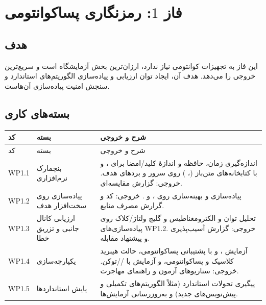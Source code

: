 \section{فاز $1$: رمزنگاری پساکوانتومی}
\label{sec:phase1}
\subsection{هدف}
این فاز به تجهیزات کوانتومی نیاز ندارد، ارزان‌ترین بخش آزمایشگاه است و سریع‌ترین خروجی را می‌دهد. هدف آن، ایجاد توان ارزیابی و پیاده‌سازی الگوریتم‌های استاندارد و سنجش امنیت پیاده‌سازی آن‌هاست.

\subsection{بسته‌های کاری}
\begin{longtable}{R{1.45cm}R{4.07cm}R{9.50cm}}
\toprule {} کد & بسته & شرح و خروجی \\ \midrule
\endfirsthead
\toprule {} کد & بسته & شرح و خروجی \\ \midrule
\endhead
WP1.1 & بنچمارک نرم‌افزاری & اندازه‌گیری زمان، حافظه و اندازهٔ کلید/امضا برای ،  و  با کتابخانه‌های متن‌باز (، ) روی سرور و بردهای هدف. خروجی: گزارش مقایسه‌ای. \\
WP1.2 & پیاده‌سازی روی سخت‌افزار هدف & پیاده‌سازی و بهینه‌سازی روی ،  و . خروجی: کد و گزارش مصرف منابع. \\
WP1.3 & ارزیابی کانال جانبی و تزریق خطا & تحلیل توان و الکترومغناطیس و گلیچ ولتاژ/کلاک روی پیاده‌سازی‌های WP1.2. خروجی: گزارش آسیب‌پذیری و پیشنهاد مقابله. \\
WP1.4 & یکپارچه‌سازی & آزمایش ،  و  با پشتیبانی پساکوانتومی، حالت هیبرید کلاسیک و پساکوانتومی، و آزمایش با //توکن. خروجی: سناریوهای آزمون و راهنمای مهاجرت. \\
WP1.5 & پایش استانداردها & پیگیری تحولات استاندارد (مثلاً الگوریتم‌های تکمیلی و پیش‌نویس‌های جدید) و به‌روزرسانی آزمایش‌ها. \\
\bottomrule\end{longtable}

